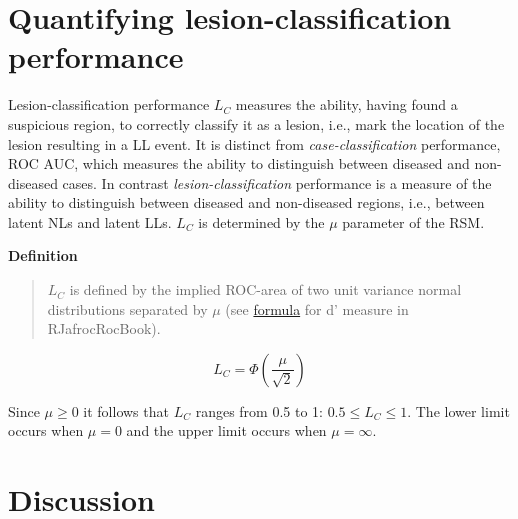 \documentclass[
]{book}
\begin{document}
\hypertarget{rsm-search-classification-performance}{%
\section{Quantifying lesion-classification performance}\label{rsm-search-classification-performance}}

Lesion-classification performance \(L_C\) measures the ability, having found a suspicious region, to correctly classify it as a lesion, i.e., mark the location of the lesion resulting in a LL event. It is distinct from \emph{case-classification} performance, ROC AUC, which measures the ability to distinguish between diseased and non-diseased cases. In contrast \emph{lesion-classification} performance is a measure of the ability to distinguish between diseased and non-diseased regions, i.e., between latent NLs and latent LLs. \(L_C\) is determined by the \(\mu\) parameter of the RSM.

\textbf{Definition}

\begin{quote}
\(L_C\) is defined by the implied ROC-area of two unit variance normal distributions separated by \(\mu\) (see \href{https://dpc10ster.github.io/RJafrocRocBook/binormal-model.html\#binormal-model-d-prime}{formula} for d' measure in RJafrocRocBook).
\end{quote}

\begin{equation}
L_C=\Phi\left ( \frac{\mu}{\sqrt{2}} \right )
\label{eq:rsm-search-classification-classification-performance}
\end{equation}

Since \(\mu \ge 0\) it follows that \(L_C\) ranges from 0.5 to 1: \(0.5 \le L_C \le 1\). The lower limit occurs when \(\mu = 0\) and the upper limit occurs when \(\mu = \infty\).

\hypertarget{rsm-search-classification-discussion}{%
\section{Discussion}\label{rsm-search-classification-discussion}}
\end{document}

